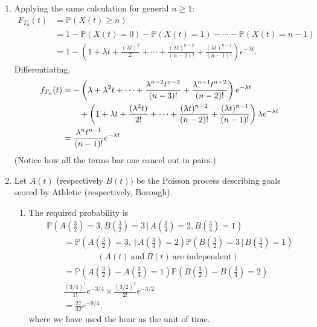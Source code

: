\documentclass[11pt,a4paper]{article}
\begin{document}
\begin{enumerate}
        \item Applying the same calculation for general $n \geq 1$:
        \begin{align*}
            F_{T_n}(t)
            &= \mathbb{P}(X(t) \geq n)\\
            &= 1- \mathbb{P}(X(t)=0)-\mathbb{P}(X(t)=1)-\cdots - \mathbb{P}(X(t)=n-1)\\
            &= 1- \left(1+\lambda t+\frac{(\lambda t)^2}{2!}+\cdots +\frac{(\lambda t)^{n-2}}{(n-2)!}+\frac{(\lambda t)^{n-1}}{(n-1)!}\right)e^{-\lambda t}.
        \end{align*}
        Differentiating,
        \begin{align*}
            f_{T_n}(t)
            &= -\left(\lambda + \lambda^2t+\cdots+\frac{\lambda^{n-2}t^{n-3}}{(n-3)!}+\frac{\lambda^{n-1}t^{n-2}}{(n-2)!}\right)e^{-\lambda t}\notag \\
            & \quad \quad + \left(1 + \lambda t + \frac{(\lambda^2t)}{2!}+\cdots+\frac{(\lambda t)^{n-2}}{(n-2)!}+\frac{(\lambda t)^{n-1}}{(n-1)!}\right)\lambda e^{-\lambda t}\\
            &= \frac{\lambda^nt^{n-1}}{(n-1)!}e^{-\lambda t}
        \end{align*}
        (Notice how all the terms bar one cancel out in pairs.)
        \item Let $A(t)$ (respectively $B(t))$ be the Poisson process describing goals scored by Athletic (respectively, Borough).
        \begin{enumerate}
            \item The required probability is
            \begin{align*}
                &\mathbb{P}(A(\tfrac{3}{2})= 3, B(\tfrac{3}{2}) = 3\, | \, A(\tfrac{3}{4}) = 2, B(\tfrac{3}{4})=1)\\
                &  \qquad = \mathbb{P}(A(\tfrac{3}{2}) = 3,\ | \, A(\tfrac{3}{4}) = 2)\mathbb{P}(B(\tfrac{3}{2}) = 3\, | \, B(\tfrac{3}{4})=1)\\
                & \qquad \qquad \qquad (A(t)\ \text{and}\ B(t)\ \text{are independent})\\
                &  \qquad = \mathbb{P}(A(\tfrac{3}{2})-A(\tfrac{3}{4})=1)\mathbb{P}(B(\tfrac{3}{2})-B(\tfrac{3}{4})=2)\\
                & \qquad \tfrac{(3/4)^1}{1!}e^{-3/4} \times \tfrac{(3/2)^2}{2!}e^{-3/2}\\
                & \qquad = \tfrac{27}{32}e^{-9/4},
            \end{align*}
            where we have used the hour as the unit of time.

\end{enumerate}
\end{enumerate}
\end{document}
